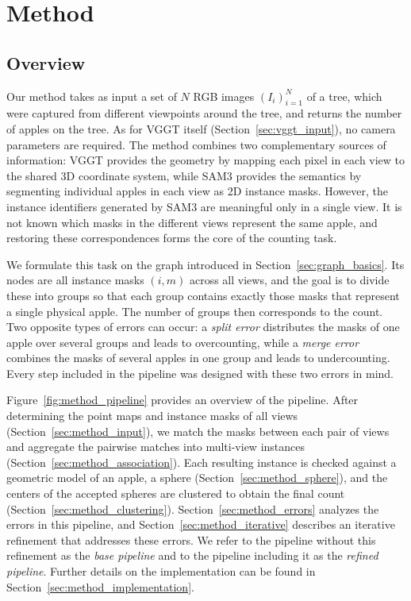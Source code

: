 \documentclass[english, egger, bsc]{vcethesis}
\begin{document}
\chapter{Method}
\label{chap:method}

\section{Overview}
\label{sec:method_overview}
Our method takes as input a set of $N$ RGB images $(I_i)_{i=1}^{N}$ of a tree, which were captured from different viewpoints around the tree, and returns the number of apples on the tree. As for VGGT itself (Section~\ref{sec:vggt_input}), no camera parameters are required. The method combines two complementary sources of information: VGGT provides the geometry by mapping each pixel in each view to the shared 3D coordinate system, while SAM3 \cite{carion2026sam3segmentconcepts} provides the semantics by segmenting individual apples in each view as 2D instance masks. However, the instance identifiers generated by SAM3 are meaningful only in a single view. It is not known which masks in the different views represent the same apple, and restoring these correspondences forms the core of the counting task.

We formulate this task on the graph introduced in Section~\ref{sec:graph_basics}. Its nodes are all instance masks $(i,m)$ across all views, and the goal is to divide these into groups so that each group contains exactly those masks that represent a single physical apple. The number of groups then corresponds to the count. Two opposite types of errors can occur: a \emph{split error} distributes the masks of one apple over several groups and leads to overcounting, while a \emph{merge error} combines the masks of several apples in one group and leads to undercounting. Every step included in the pipeline was designed with these two errors in mind. 

Figure~\ref{fig:method_pipeline} provides an overview of the pipeline. After determining the point maps and instance masks of all views (Section~\ref{sec:method_input}), we match the masks between each pair of views and aggregate the pairwise matches into multi-view instances (Section~\ref{sec:method_association}). Each resulting instance is checked against a geometric model of an apple, a sphere (Section~\ref{sec:method_sphere}), and the centers of the accepted spheres are clustered to obtain the final count (Section~\ref{sec:method_clustering}). Section~\ref{sec:method_errors} analyzes the errors in this pipeline, and Section~\ref{sec:method_iterative} describes an iterative refinement that addresses these errors. We refer to the pipeline without this refinement as the \emph{base pipeline} and to the pipeline including it as the \emph{refined pipeline}. Further details on the implementation can be found in Section~\ref{sec:method_implementation}.
\end{document}
